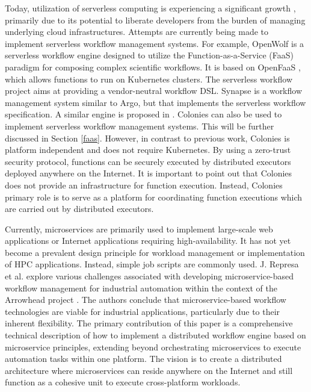 \documentclass{article}
\begin{document}
Today, utilization of serverless computing is experiencing a significant growth \cite{cognit}, primarily due to its potential to liberate developers from the burden of managing underlying cloud infrastructures. Attempts are currently being made to implement serverless workflow management systems. For example, OpenWolf \cite{openwolf} is a serverless workflow engine designed to utilize the Function-as-a-Service (FaaS) paradigm for composing complex scientific workflows. It is based on OpenFaaS \cite{openfaas}, which allows functions to run on Kubernetes clusters. 
The serverless workflow project \cite{serverlessworkflows} aims at providing a vendor-neutral workflow DSL. Synapse \cite{synapse} is a workflow management system similar to Argo, but that implements the serverless workflow specification. A similar engine is proposed in \cite{scafe}. 
Colonies can also be used to implement serverless workflow management systems. This will be further discussed in Section \ref{faas}. However, in contrast to previous work, Colonies is platform independent and does not require Kubernetes. By using a zero-trust security protocol, functions can be securely executed by distributed executors deployed anywhere on the Internet. It is important to point out that Colonies does not provide an infrastructure for function execution. Instead, Colonies primary role is to serve as a platform for coordinating function executions which are carried out by distributed executors.

Currently, microservices are primarily used to implement large-scale web applications or Internet applications requiring high-availability. It has not yet become a prevalent design principle for workload management or implementation of HPC applications. Instead, simple job scripts are commonly used. J. Represa et al. \cite{GarciaRepresa1740746, GarciaRepresa1640771} explore various challenges associated with developing microservice-based workflow management for industrial automation within the context of the Arrowhead project \cite{delsing2017iot}. The authors conclude that microservice-based workflow technologies are viable for industrial applications, particularly due to their inherent flexibility. The primary contribution of this paper is a comprehensive technical description of how to implement a distributed workflow engine based on microservice principles, extending beyond orchestrating microservices to execute automation tasks within one platform. The vision is to create a distributed architecture where microservices can reside anywhere on the Internet and still function as a cohesive unit to execute cross-platform workloads.  
\end{document}
